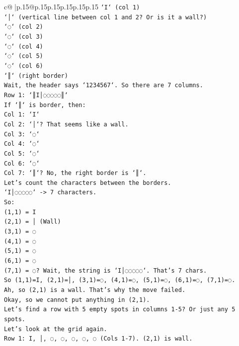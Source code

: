 \documentclass{article}
\begin{document}
{\begin{supertabular}{c@{$\;$}|p{.15\linewidth}@{}p{.15\linewidth}p{.15\linewidth}p{.15\linewidth}p{.15\linewidth}p{.15\linewidth}}
{{{\texttt{`I` (col 1)} \\
\texttt{`│` (vertical line between col 1 and 2? Or is it a wall?)} \\
\texttt{`◌` (col 2)} \\
\texttt{`◌` (col 3)} \\
\texttt{`◌` (col 4)} \\
\texttt{`◌` (col 5)} \\
\texttt{`◌` (col 6)} \\
\texttt{`║` (right border)} \\
\texttt{Wait, the header says `1234567`. So there are 7 columns.} \\
\texttt{Row 1: `║I│◌◌◌◌◌║`} \\
\texttt{If `║` is border, then:} \\
\texttt{Col 1: `I`} \\
\texttt{Col 2: `│`? That seems like a wall.} \\
\texttt{Col 3: `◌`} \\
\texttt{Col 4: `◌`} \\
\texttt{Col 5: `◌`} \\
\texttt{Col 6: `◌`} \\
\texttt{Col 7: `║`? No, the right border is `║`.} \\
\texttt{Let's count the characters between the borders.} \\
\texttt{`I│◌◌◌◌◌` {-}> 7 characters.} \\
\texttt{So:} \\
\texttt{(1,1) = I} \\
\texttt{(2,1) = │ (Wall)} \\
\texttt{(3,1) = ◌} \\
\texttt{(4,1) = ◌} \\
\texttt{(5,1) = ◌} \\
\texttt{(6,1) = ◌} \\
\texttt{(7,1) = ◌? Wait, the string is `I│◌◌◌◌◌`. That's 7 chars.} \\
\texttt{So (1,1)=I, (2,1)=│, (3,1)=◌, (4,1)=◌, (5,1)=◌, (6,1)=◌, (7,1)=◌.} \\
\texttt{Ah, so (2,1) is a wall. That's why the move failed.} \\
\texttt{Okay, so we cannot put anything in (2,1).} \\
\texttt{Let's find a row with 5 empty spots in columns 1{-}5? Or just any 5 spots.} \\
\texttt{Let's look at the grid again.} \\
\texttt{Row 1: I, │, ◌, ◌, ◌, ◌, ◌ (Cols 1{-}7). (2,1) is wall.} \\
}}}
\end{supertabular}}
\end{document}
